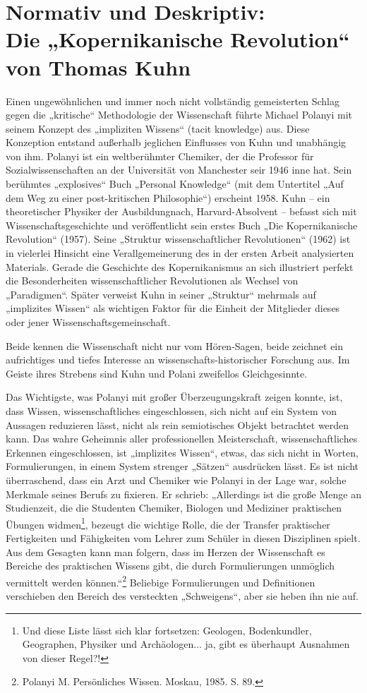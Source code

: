 \documentclass[11pt,a4paper]{article}
\begin{document}
\section*{Normativ und Deskriptiv:\\ Die „Kopernikanische Revolution“ von
  Thomas Kuhn}

Einen ungewöhnlichen und immer noch nicht vollständig gemeisterten Schlag
gegen die „kritische“ Methodologie der Wissenschaft führte Michael Polanyi mit
seinem Konzept des „impliziten Wissens“ (tacit knowledge) aus. Diese
Konzeption entstand außerhalb jeglichen Einflusses von Kuhn und unabhängig von
ihm. Polanyi ist ein weltberühmter Chemiker, der die Professor für
Sozialwissenschaften an der Universität von Manchester seir 1946 inne hat.
Sein berühmtes „explosives“ Buch „Personal Knowledge“ (mit dem Untertitel „Auf
dem Weg zu einer post-kritischen Philosophie“) erscheint 1958. Kuhn -- ein
theoretischer Physiker der Ausbildungnach, Harvard-Absolvent -- befasst sich
mit Wissenschaftsgeschichte und veröffentlicht sein erstes Buch „Die
Kopernikanische Revolution“ (1957). Seine „Struktur wissenschaftlicher
Revolutionen“ (1962) ist in vielerlei Hinsicht eine Verallgemeinerung des in
der ersten Arbeit analysierten Materials. Gerade die Geschichte des
Kopernikanismus an sich illustriert perfekt die Besonderheiten
wissenschaftlicher Revolutionen als Wechsel von „Paradigmen“. Später verweist
Kuhn in seiner „Struktur“ mehrmals auf „implizites Wissen“ als wichtigen
Faktor für die Einheit der Mitglieder dieses oder jener
Wissenschaftsgemeinschaft.

Beide kennen die Wissenschaft nicht nur vom Hören-Sagen, beide zeichnet ein
aufrichtiges und tiefes Interesse an wissenschafts-historischer Forschung aus.
Im Geiste ihres Strebens sind Kuhn und Polani zweifellos Gleichgesinnte.

Das Wichtigste, was Polanyi mit großer Überzeugungskraft zeigen konnte, ist,
dass Wissen, wissenschaftliches eingeschlossen, sich nicht auf ein System von
Aussagen reduzieren lässt, nicht als rein semiotisches Objekt betrachtet
werden kann. Das wahre Geheimnis aller professionellen Meisterschaft,
wissenschaftliches Erkennen eingeschlossen, ist „implizites Wissen“, etwas,
das sich nicht in Worten, Formulierungen, in einem System strenger „Sätzen“
ausdrücken lässt. Es ist nicht überraschend, dass ein Arzt und Chemiker wie
Polanyi in der Lage war, solche Merkmale seines Berufs zu fixieren. Er
schrieb: „Allerdings ist die große Menge an Studienzeit, die die Studenten
Chemiker, Biologen und Mediziner praktischen Übungen widmen\footnote{Und diese
  Liste lässt sich klar fortsetzen: Geologen, Bodenkundler, Geographen,
  Physiker und Archäologen... ja, gibt es überhaupt Ausnahmen von dieser
  Regel?!}, bezeugt die wichtige Rolle, die der Transfer praktischer
Fertigkeiten und Fähigkeiten vom Lehrer zum Schüler in diesen Disziplinen
spielt.  Aus dem Gesagten kann man folgern, dass im Herzen der Wissenschaft es
Bereiche des praktischen Wissens gibt, die durch Formulierungen unmöglich
vermittelt werden können.“\footnote{Polanyi M. Persönliches Wissen.  Moskau,
  1985. S. 89.} Beliebige Formulierungen und Definitionen verschieben den
Bereich des versteckten „Schweigens“, aber sie heben ihn nie auf.
\end{document}
